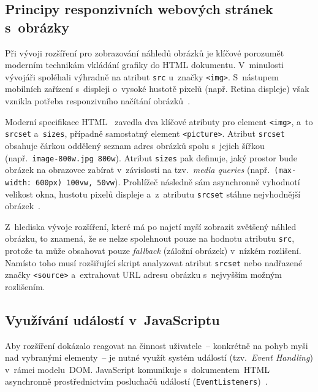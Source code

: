 \documentclass[a4paper,12pt]{article}
\begin{document}
\subsection{Principy responzivních webových stránek s~obrázky}
\label{subsec:teorie_responzivni}

Při vývoji rozšíření pro zobrazování náhledů obrázků je klíčové porozumět moderním technikám vkládání grafiky do HTML dokumentu. V~minulosti vývojáři spoléhali výhradně na atribut \texttt{src} u~značky \texttt{<img>}. S~nástupem mobilních zařízení s~displeji o~vysoké hustotě pixelů (např. Retina displeje) však vznikla potřeba responzivního načítání obrázků~\autocite{frain2020}. 

Moderní specifikace HTML~\autocite{whatwg_html} zavedla dva klíčové atributy pro element \texttt{<img>}, a~to \texttt{srcset} a~\texttt{sizes}, případně samostatný element \texttt{<picture>}. Atribut \texttt{srcset} obsahuje čárkou oddělený seznam adres obrázků spolu s~jejich šířkou (např.~\texttt{image-800w.jpg 800w}). Atribut \texttt{sizes} pak definuje, jaký prostor bude obrázek na obrazovce zabírat v~závislosti na tzv.~\textit{media queries} (např.~\texttt{(max-width:~600px) 100vw, 50vw}). Prohlížeč následně sám asynchronně vyhodnotí velikost okna, hustotu pixelů displeje a~z~atributu \texttt{srcset} stáhne nejvhodnější obrázek~\autocite{mdn_img}. 

Z~hlediska vývoje rozšíření, které má po najetí myší zobrazit zvětšený náhled obrázku, to znamená, že se nelze spolehnout pouze na hodnotu atributu \texttt{src}, protože ta může obsahovat pouze \textit{fallback} (záložní obrázek) v~nízkém rozlišení. Namísto toho musí rozšiřující skript analyzovat atribut \texttt{srcset} nebo nadřazené značky \texttt{<source>} a~extrahovat URL adresu obrázku s~nejvyšším možným rozlišením.

\subsection{Využívání událostí v~JavaScriptu}
\label{subsec:teorie_udalosti}

Aby rozšíření dokázalo reagovat na činnost uživatele~-- konkrétně na pohyb myši nad vybranými elementy~-- je nutné využít systém událostí (tzv.~\textit{Event Handling}) v~rámci modelu~DOM. JavaScript komunikuje s~dokumentem~HTML asynchronně prostřednictvím posluchačů událostí (\texttt{EventListeners})~\autocite{flanagan2020}. 
\end{document}

